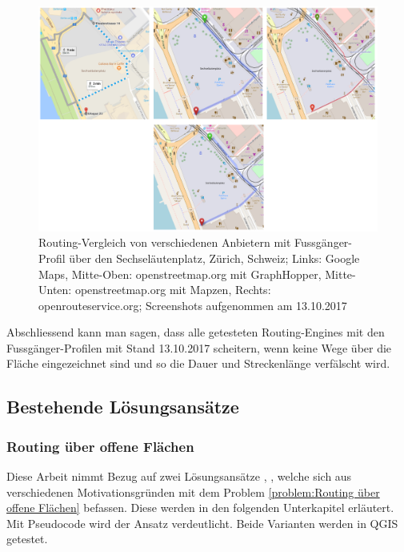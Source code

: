 \begin{figure}[ht]
\centering
\includegraphics[width=1\linewidth]{technicalreport/img/sechselaeutenplatz_comparison}
\caption[Fussgänger-Routing Vergleich]{Routing-Vergleich von verschiedenen Anbietern mit Fussgänger-Profil über den Sechseläutenplatz, Zürich, Schweiz; Links: Google Maps, Mitte-Oben: openstreetmap.org mit GraphHopper, Mitte-Unten: openstreetmap.org mit Mapzen, Rechts: openrouteservice.org; Screenshots aufgenommen am 13.10.2017}
\label{fig:sechselaeutenplatz_comparison}
\end{figure}


Abschliessend kann man sagen, dass alle getesteten Routing-Engines mit den Fussgänger-Profilen mit Stand 13.10.2017 scheitern, wenn keine Wege über die Fläche eingezeichnet sind und so die Dauer und Streckenlänge verfälscht wird.

\subsection{Bestehende Lösungsansätze}
\label{sub:Bestehende Lösungsansätze}


\subsubsection{Routing über offene Flächen}
\label{solution:Routing über offene Flächen}

Diese Arbeit nimmt Bezug auf zwei Lösungsansätze \cite{graser_visibility_graph}, \cite{dzafic_spider_web_graph}, welche sich aus verschiedenen Motivationsgründen mit dem Problem \ref{problem:Routing über offene Flächen} befassen. Diese werden in den folgenden Unterkapitel erläutert. Mit Pseudocode wird der Ansatz verdeutlicht. Beide Varianten werden in QGIS getestet. 


